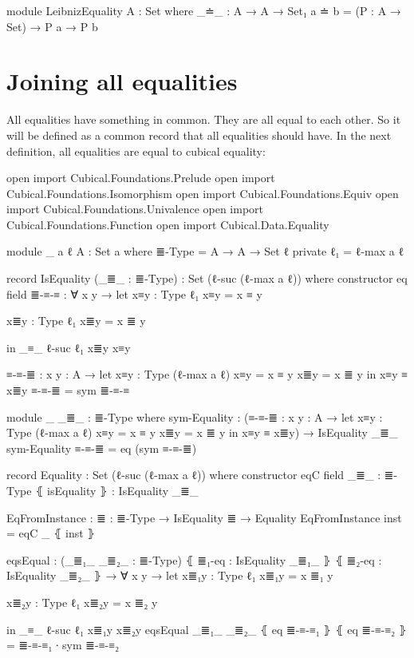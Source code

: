 \documentclass{article}
\begin{document}
\begin{code}
module LeibnizEquality {A : Set} where
  _≐_ : A → A → Set₁
  a ≐ b = (P : A → Set) → P a → P b
\end{code}

\section{Joining all equalities}

All equalities have something in common. They are all equal to each other.
So it will be defined as a common record that all equalities should have.
In the next definition, all equalities are equal to cubical equality:

\begin{code}

open import Cubical.Foundations.Prelude
open import Cubical.Foundations.Isomorphism
open import Cubical.Foundations.Equiv
open import Cubical.Foundations.Univalence
open import Cubical.Foundations.Function
open import Cubical.Data.Equality

module _ {a ℓ} {A : Set a} where
  ≣-Type = A → A → Set ℓ
  private
    ℓ₁ = ℓ-max a ℓ

  record IsEquality (_≣_ : ≣-Type) : Set (ℓ-suc (ℓ-max a ℓ)) where
    constructor eq
    field
      ≣-≡-≡ : ∀ {x y} → let
        x≡y : Type ℓ₁
        x≡y = x ≡ y

        x≣y : Type ℓ₁
        x≣y = x ≣ y

        in _≡_ {ℓ-suc ℓ₁} x≣y x≡y

    ≡-≡-≣ : {x y : A} → let
      x≡y : Type (ℓ-max a ℓ)
      x≡y = x ≡ y
      x≣y = x ≣ y
      in x≡y ≡ x≣y
    ≡-≡-≣ = sym ≣-≡-≡

  module _ {_≣_ : ≣-Type} where
    sym-Equality : (≡-≡-≣ : {x y : A} → let
      x≡y : Type (ℓ-max a ℓ)
      x≡y = x ≡ y
      x≣y = x ≣ y
      in x≡y ≡ x≣y)
      → IsEquality _≣_
    sym-Equality ≡-≡-≣ = eq (sym ≡-≡-≣)

  record Equality : Set (ℓ-suc (ℓ-max a ℓ)) where
    constructor eqC
    field
      _≣_ : ≣-Type
      ⦃ isEquality ⦄ : IsEquality _≣_

  EqFromInstance : {≣ : ≣-Type} → IsEquality ≣ → Equality
  EqFromInstance inst = eqC _ ⦃ inst ⦄

  eqsEqual : (_≣₁_ _≣₂_ : ≣-Type)
    ⦃ ≣₁-eq : IsEquality _≣₁_ ⦄
    ⦃ ≣₂-eq : IsEquality _≣₂_ ⦄
    → ∀ {x y} → let
      x≣₁y : Type ℓ₁
      x≣₁y = x ≣₁ y

      x≣₂y : Type ℓ₁
      x≣₂y = x ≣₂ y

      in _≡_ {ℓ-suc ℓ₁} x≣₁y x≣₂y
  eqsEqual _≣₁_ _≣₂_ ⦃ eq ≣-≡-≡₁ ⦄ ⦃ eq ≣-≡-≡₂ ⦄ = ≣-≡-≡₁ ∙ sym ≣-≡-≡₂
\end{code}
\end{document}
